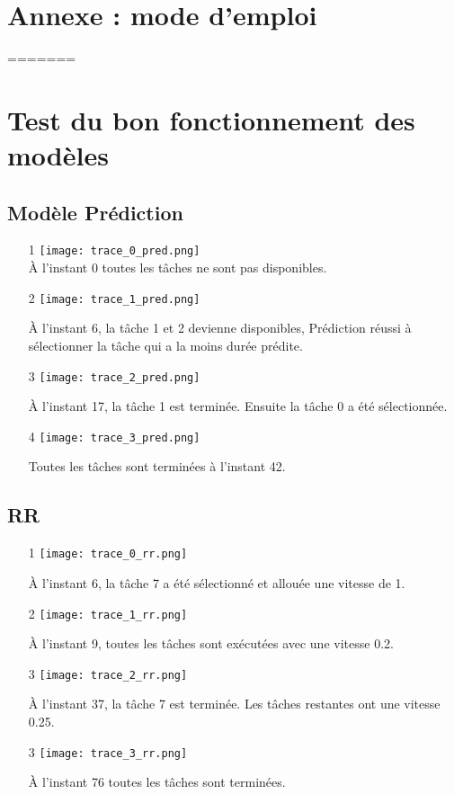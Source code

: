 \documentclass[12pt]{article}
\begin{document}
\newpage
\section{Annexe : mode d'emploi}
=======

\section{Test du bon fonctionnement des modèles}
    \subsection{Modèle Prédiction}
    \begin{itemize}
        \item[1]\texttt{[image: trace\_0\_pred.png]} \\
        À l'instant 0 toutes les tâches ne sont pas disponibles.
        
        \item[2]\texttt{[image: trace\_1\_pred.png]}
        
        À l'instant 6, la tâche 1 et 2 devienne disponibles, Prédiction réussi à sélectionner la tâche qui a la moins durée prédite.
        
        \item[3] \texttt{[image: trace\_2\_pred.png]} 
        
        À l'instant 17, la tâche 1 est terminée. Ensuite la tâche 0 a été sélectionnée.
        
        \item[4]  \texttt{[image: trace\_3\_pred.png]}
        
        Toutes les tâches sont terminées à l'instant 42.
    
    \end{itemize}
    
    \subsection{RR}
    \begin{itemize}
        \item[1]\texttt{[image: trace\_0\_rr.png]}
        
        À l'instant 6, la tâche 7 a été sélectionné et allouée une vitesse de 1.
        
        \item[2]\texttt{[image: trace\_1\_rr.png]}
        
        À l'instant 9, toutes les tâches sont exécutées avec une vitesse 0.2.
        
        \item[3]\texttt{[image: trace\_2\_rr.png]}
        
        À l'instant 37, la tâche 7 est terminée. Les tâches restantes ont une vitesse 0.25.
        
        \item[3]\texttt{[image: trace\_3\_rr.png]}
        
        À l'instant 76 toutes les tâches sont terminées.
        
    \end{itemize}
\end{document}
